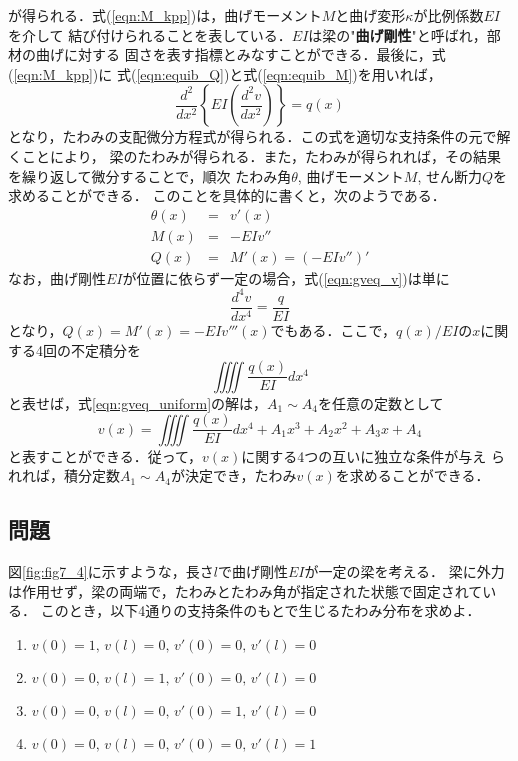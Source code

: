 \documentclass[10pt,a4j]{jbook}
\begin{document}
が得られる．式(\ref{eqn:M_kpp})は，曲げモーメント$M$と曲げ変形$\kappa$が比例係数$EI$を介して
結び付けられることを表している．$EI$は梁の"{\bf 曲げ剛性}"と呼ばれ，部材の曲げに対する
固さを表す指標とみなすことができる．最後に，式(\ref{eqn:M_kpp})に
式(\ref{eqn:equib_Q})と式(\ref{eqn:equib_M})を用いれば，
\begin{equation}
	\frac{d^2}{dx^2}\left\{ EI \left(\frac{d^2v}{dx^2}\right)\right\}=q(x)
	\label{eqn:gveq_v}
\end{equation}
となり，たわみの支配微分方程式が得られる．この式を適切な支持条件の元で解くことにより，
梁のたわみが得られる．また，たわみが得られれば，その結果を繰り返して微分することで，順次
たわみ角$\theta$, 曲げモーメント$M$, せん断力$Q$を求めることができる．
このことを具体的に書くと，次のようである．
\begin{eqnarray}
	\theta(x) &=& v'(x) \\
	M(x) &=& -EIv '' \\
	Q(x) &=& M'(x) = \left(-EIv''\right)' 
\end{eqnarray}
なお，曲げ剛性$EI$が位置に依らず一定の場合，式(\ref{eqn:gveq_v})は単に
\begin{equation}
	\frac{d^4v}{dx^4}=\frac{q}{EI}
	\label{eqn:gveq_uniform}
\end{equation}
となり，$Q(x)=M'(x)=-EIv'''(x)$でもある．ここで，$q(x)/EI$の$x$に関する4回の不定積分を
\[
	\iiiint \frac{q(x)}{EI}dx^4
\]
と表せば，式\ref{eqn:gveq_uniform}の解は，$A_1\sim A_4$を任意の定数として
\begin{equation}
	v(x)= 
	\iiiint \frac{q(x)}{EI}dx^4
	+A_1 x^3 +A_2x^2 + A_3x + A_4
	\label{eqn:vx_gsol}
\end{equation}
と表すことができる．従って，$v(x)$に関する4つの互いに独立な条件が与え
られれば，積分定数$A_1\sim A_4$が決定でき，たわみ$v(x)$を求めることができる．
\subsection{問題}\label{prb}
図\ref{fig:fig7_4}に示すような，長さ$l$で曲げ剛性$EI$が一定の梁を考える．
梁に外力は作用せず，梁の両端で，たわみとたわみ角が指定された状態で固定されている．
このとき，以下4通りの支持条件のもとで生じるたわみ分布を求めよ．
\begin{enumerate}
\item
$v(0)=1,\, v(l)=0,\, v'(0)=0,\, v'(l)=0$
\item
$v(0)=0,\, v(l)=1,\, v'(0)=0,\, v'(l)=0$
\item
$v(0)=0,\, v(l)=0,\, v'(0)=1,\, v'(l)=0$
\item
$v(0)=0,\, v(l)=0,\, v'(0)=0,\, v'(l)=1$
\end{enumerate}
\end{document}
